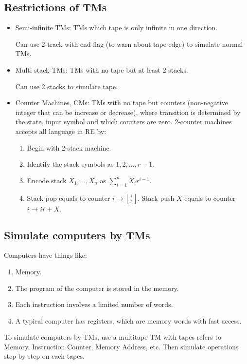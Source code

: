     \subsection{Restrictions of TMs}
    \begin{itemize}
        \item Semi-infinite TMs: TMs which tape is only infinite in one direction.

            Can use 2-track with end-flag (to warn about tape edge) to simulate normal TMs.
        \item Multi stack TMs: TMs with no tape but at least 2 stacks.

            Can use 2 stacks to simulate tape.
        \item Counter Machines, CMs: TMs with no tape but counters (non-negative integer that can be increase or decrease), where transition is determined by the state, input symbol and which counters are zero. 2-counter machines accepts all language in RE by:
            \begin{enumerate}
                \item Begin with 2-stack machine.
                \item Identify the stack symbols as $1,2,\ldots,r-1$.
                \item Encode stack $X_1,\ldots,X_{n}$ as $\sum_{i=1}^{n}X_{i}r^{i-1}$.
                \item Stack pop equals to counter $i\rightarrow \left\lfloor \frac{i}{r}\right\rfloor$. Stack push $X$ equals to counter $i\rightarrow ir+X$.
            \end{enumerate}
    \end{itemize}
    \subsection{Simulate computers by TMs}
    Computers have things like:
    \begin{enumerate}
        \item Memory.
        \item The program of the computer is stored in the memory.
        \item Each instruction involves a limited number of words.
        \item A typical computer has registers, which are memory words with fast access.
    \end{enumerate}
    To simulate computers by TMs, use a multitape TM with tapes refers to Memory, Instruction Counter, Memory Address, etc. Then simulate operations step by step on each tapes.

